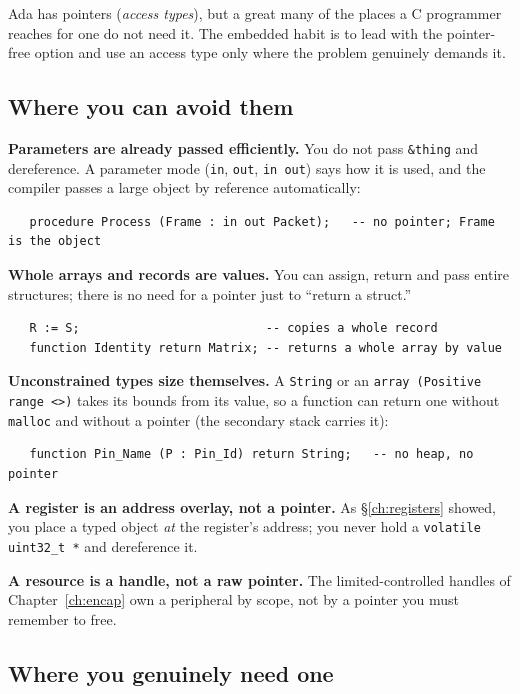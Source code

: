 Ada has pointers (\emph{access types}), but a great many of the places a C
programmer reaches for one do not need it. The embedded habit is to lead with the
pointer-free option and use an access type only where the problem genuinely
demands it.

\subsection{Where you can avoid them}

\textbf{Parameters are already passed efficiently.} You do not pass
\texttt{\&thing} and dereference. A parameter mode (\texttt{in},
\texttt{out}, \texttt{in out}) says how it is used, and the compiler passes a
large object by reference automatically:

\begin{lstlisting}
   procedure Process (Frame : in out Packet);   -- no pointer; Frame is the object
\end{lstlisting}

\textbf{Whole arrays and records are values.} You can assign, return and pass
entire structures; there is no need for a pointer just to ``return a struct.''

\begin{lstlisting}
   R := S;                          -- copies a whole record
   function Identity return Matrix; -- returns a whole array by value
\end{lstlisting}

\textbf{Unconstrained types size themselves.} A \texttt{String} or an
\texttt{array (Positive range <>)} takes its bounds from its value, so a function
can return one without \texttt{malloc} and without a pointer (the secondary stack
carries it):

\begin{lstlisting}
   function Pin_Name (P : Pin_Id) return String;   -- no heap, no pointer
\end{lstlisting}

\textbf{A register is an address overlay, not a pointer.} As
\S\ref{ch:registers} showed, you place a typed object \emph{at} the register's
address; you never hold a \texttt{volatile uint32\_t *} and dereference it.

\textbf{A resource is a handle, not a raw pointer.} The limited-controlled handles
of Chapter~\ref{ch:encap} own a peripheral by scope, not by a pointer you must
remember to free.

\subsection{Where you genuinely need one}

